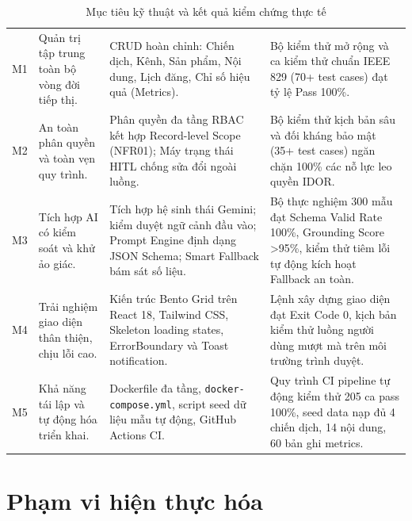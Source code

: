 \begin{table}[H]
\centering
\footnotesize
\renewcommand{\arraystretch}{1.02}
\caption{Mục tiêu kỹ thuật và kết quả kiểm chứng thực tế}
\label{tab:v9-goals}
\begin{tabularx}{\textwidth}{|C{1.0cm}|L{3.5cm}|Y|L{3.4cm}|}
\hline
{} &  &  & \\
\hline
M1 & Quản trị tập trung toàn bộ vòng đời tiếp thị. & CRUD hoàn chỉnh: Chiến dịch, Kênh, Sản phẩm, Nội dung, Lịch đăng, Chỉ số hiệu quả (Metrics). & Bộ kiểm thử mở rộng và ca kiểm thử chuẩn IEEE 829 (70+ test cases) đạt tỷ lệ Pass 100\%.\\
\hline
M2 & An toàn phân quyền và toàn vẹn quy trình. & Phân quyền đa tầng RBAC kết hợp Record-level Scope (NFR01); Máy trạng thái HITL chống sửa đổi ngoài luồng. & Bộ kiểm thử kịch bản sâu và đối kháng bảo mật (35+ test cases) ngăn chặn 100\% các nỗ lực leo quyền IDOR.\\
\hline
M3 & Tích hợp AI có kiểm soát và khử ảo giác. & Tích hợp hệ sinh thái Gemini; kiểm duyệt ngữ cảnh đầu vào; Prompt Engine định dạng JSON Schema; Smart Fallback bám sát số liệu. & Bộ thực nghiệm 300 mẫu đạt Schema Valid Rate 100\%, Grounding Score >95\%, kiểm thử tiêm lỗi tự động kích hoạt Fallback an toàn.\\
\hline
M4 & Trải nghiệm giao diện thân thiện, chịu lỗi cao. & Kiến trúc Bento Grid trên React 18, Tailwind CSS, Skeleton loading states, ErrorBoundary và Toast notification. & Lệnh xây dựng giao diện đạt Exit Code 0, kịch bản kiểm thử luồng người dùng mượt mà trên môi trường trình duyệt.\\
\hline
M5 & Khả năng tái lập và tự động hóa triển khai. & Dockerfile đa tầng, \texttt{docker-compose.yml}, script seed dữ liệu mẫu tự động, GitHub Actions CI. & Quy trình CI pipeline tự động kiểm thử 205 ca pass 100\%, seed data nạp đủ 4 chiến dịch, 14 nội dung, 60 bản ghi metrics.\\
\hline
\end{tabularx}
\end{table}

\section{Phạm vi hiện thực hóa}

